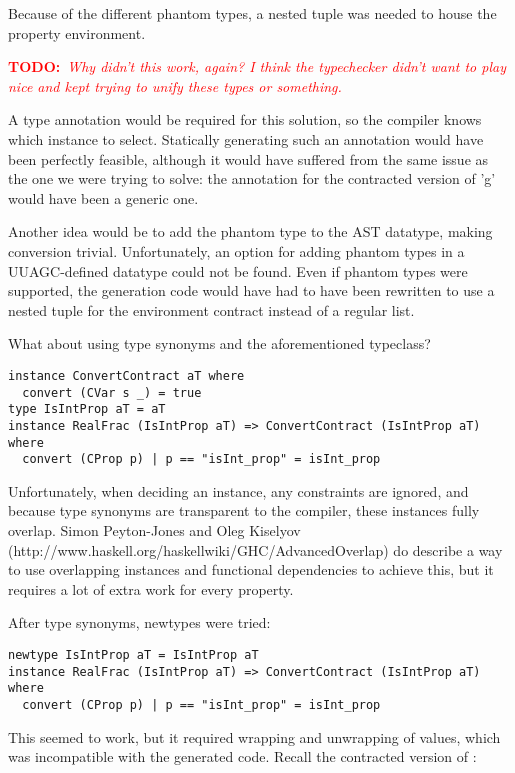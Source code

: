 \documentclass[10pt]{report}
\newcommand{\annotate}[3]{
	\begin{scriptsize}
	\textcolor{#1}{\textbf{#2}~\textit{#3}}
	\end{scriptsize}\newline}
\newcommand{\todo}[1]{\annotate{red} {TODO:} {#1}}
\newcommand{\code}[1]{%
  {%
   \setlength{\fboxsep}{-2\fboxrule}%
   \fcolorbox{black}{light-gray}{\hspace{1.5pt}\strut\texttt{#1}\hspace{1.5pt}}%
  }%
}
\begin{document}
Because of the different phantom types, a nested tuple was needed to house the property environment. \todo{Why didn't this work, again? I think the typechecker didn't want to play nice and kept trying to unify these types or something.}

A type annotation would be required for this solution, so the compiler knows which instance to select.
Statically generating such an annotation would have been perfectly feasible, although it would have suffered from the same issue as the one we were trying to solve: 
the annotation for the contracted version of 'g' would have been a generic one.

Another idea would be to add the phantom type to the AST datatype, making conversion trivial.
Unfortunately, an option for adding phantom types in a UUAGC-defined datatype could not be found.
Even if phantom types were supported, the generation code would have had to have been rewritten to use a nested tuple for the environment contract instead of a regular list.

What about using type synonyms and the aforementioned typeclass?

\begin{lstlisting}[caption=Attempt at using type synonyms to choose the correct instances.]
instance ConvertContract aT where
  convert (CVar s _) = true
type IsIntProp aT = aT
instance RealFrac (IsIntProp aT) => ConvertContract (IsIntProp aT) where
  convert (CProp p) | p == "isInt_prop" = isInt_prop
\end{lstlisting}

Unfortunately, when deciding an instance, any constraints are ignored, and because type synonyms are transparent to the compiler, these instances fully overlap.
Simon Peyton-Jones and Oleg Kiselyov (http://www.haskell.org/haskellwiki/GHC/AdvancedOverlap) do describe a way to use overlapping instances and functional dependencies to achieve this, but it requires a lot of extra work for every property.

After type synonyms, newtypes were tried:

\begin{lstlisting}[caption=Attempt at using newtypes to choose the correct instances.]
newtype IsIntProp aT = IsIntProp aT
instance RealFrac (IsIntProp aT) => ConvertContract (IsIntProp aT) where
  convert (CProp p) | p == "isInt_prop" = isInt_prop
\end{lstlisting}

This seemed to work, but it required wrapping and unwrapping of values, which was incompatible with the generated code.
Recall the contracted version of \code{f}:
\end{document}
